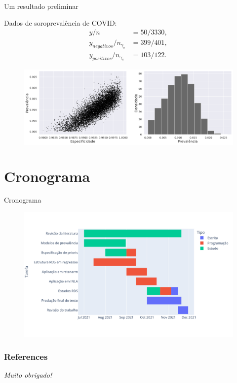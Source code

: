 \documentclass{beamer}
\begin{document}
\begin{frame}{Um resultado preliminar}

  Dados de soroprevalência de COVID:  
  \begin{align*}
    y/n &= 50/3330,\\
  y_{negativos}/n_{\gamma_e} &= 399/401, \\
  y_{positivos}/n_{\gamma_s} &= 103/122.
  \end{align*}
  \begin{figure}
    \centering
    \includegraphics[width=\textwidth]{../../images/model1_gelman_figure.png}
  \end{figure}
  
\end{frame}


\section{Cronograma}

\begin{frame}{Cronograma}

  \begin{figure}
    \centering
    \includegraphics[width = \textwidth]{../../images/gantt-chart-schedule.png}
  \end{figure}
  
\end{frame}


\begin{frame}[t, allowframebreaks]
   \frametitle{References}
   
   \nocite{*}
   
 \end{frame}

 \begin{frame}{}
  \centering \Huge
  \emph{Muito obrigado!}
\end{frame}
\end{document}

